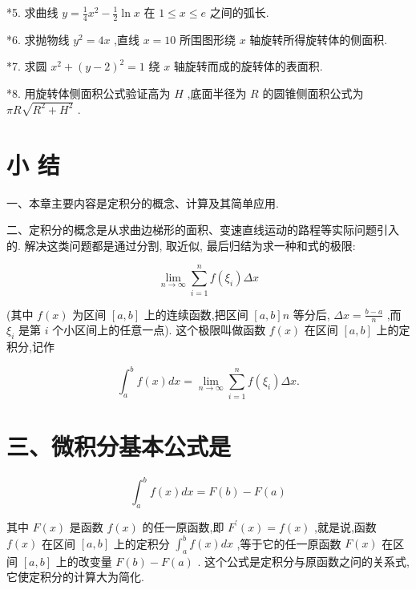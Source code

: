 \documentclass[10pt]{article}
\begin{document}
*5. 求曲线 \(y = \frac{1}{4}{x}^{2} - \frac{1}{2}\ln x\) 在 \(1 \leq x \leq e\) 之间的弧长.

*6. 求抛物线 \({y}^{2} = {4x}\) ,直线 \(x = {10}\) 所围图形绕 \(x\) 轴旋转所得旋转体的侧面积.

*7. 求圆 \({x}^{2} + {\left( y - 2\right) }^{2} = 1\) 绕 \(x\) 轴旋转而成的旋转体的表面积.

*8. 用旋转体侧面积公式验证高为 \(H\) ,底面半径为 \(R\) 的圆锥侧面积公式为 \({\pi R}\sqrt{{R}^{2} + {H}^{2}}\) .

\section*{小 结}

一、本章主要内容是定积分的概念、计算及其简单应用.

二、定积分的概念是从求曲边梯形的面积、变速直线运动的路程等实际问题引入的. 解决这类问题都是通过分割, 取近似, 最后归结为求一种和式的极限:

\[
\mathop{\lim }\limits_{{n \rightarrow \infty }}\mathop{\sum }\limits_{{i = 1}}^{n}f\left( {\xi }_{i}\right) {\Delta x}
\]

(其中 \(f\left( x\right)\) 为区间 \(\left\lbrack {a,b}\right\rbrack\) 上的连续函数,把区间 \(\left\lbrack {a,b}\right\rbrack n\) 等分后, \({\Delta x} = \frac{b - a}{n}\) ,而 \({\xi }_{i}\) 是第 \(i\) 个小区间上的任意一点). 这个极限叫做函数 \(f\left( x\right)\) 在区间 \(\left\lbrack {a,b}\right\rbrack\) 上的定积分,记作

\[
{\int }_{a}^{b}f\left( x\right) {dx} = \mathop{\lim }\limits_{{n \rightarrow \infty }}\mathop{\sum }\limits_{{i = 1}}^{n}f\left( {\xi }_{i}\right) {\Delta x}.
\]

\section*{三、微积分基本公式是}

\[
{\int }_{a}^{b}f\left( x\right) {dx} = F\left( b\right) - F\left( a\right)
\]

其中 \(F\left( x\right)\) 是函数 \(f\left( x\right)\) 的任一原函数,即 \({F}^{\prime }\left( x\right) = f\left( x\right)\) ,就是说,函数 \(f\left( x\right)\) 在区间 \(\left\lbrack {a,b}\right\rbrack\) 上的定积分 \({\int }_{a}^{b}f\left( x\right) {dx}\) ,等于它的任一原函数 \(F\left( x\right)\) 在区间 \(\left\lbrack {a,b}\right\rbrack\) 上的改变量 \(F\left( b\right) - F\left( a\right)\) . 这个公式是定积分与原函数之问的关系式, 它使定积分的计算大为简化.
\end{document}

